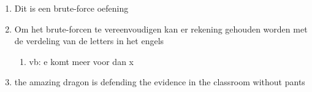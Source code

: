 \begin{enumerate}
  \item Dit is een brute-force oefening
  \item Om het brute-forcen te vereenvoudigen kan er rekening gehouden worden met de verdeling van de letters in het engels
  \begin{enumerate}
  \item vb: e komt meer voor dan x
  \end{enumerate}
  \item the amazing dragon is defending the evidence in the classroom without pants
\end{enumerate}